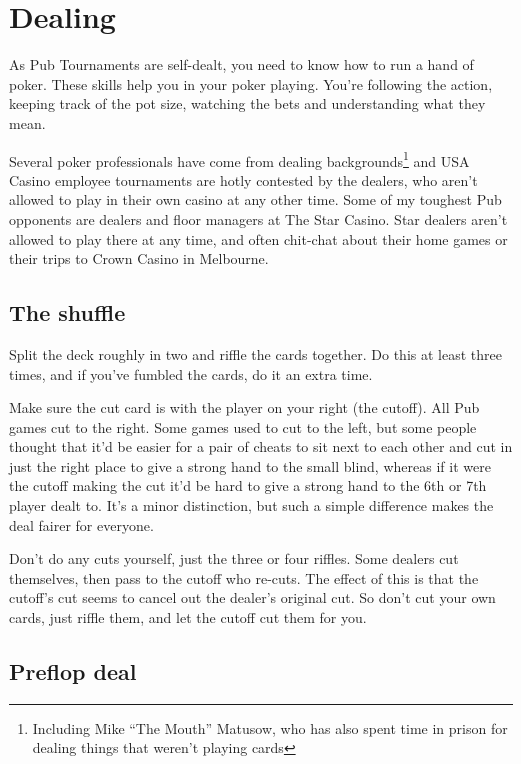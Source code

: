 \chapter{Dealing}


As Pub Tournaments are self-dealt, you need to know how
to run a hand of poker. These skills
help you in your poker playing. You're following
the action, keeping track of the pot size, watching
the bets and understanding what they mean.

Several poker professionals have come from dealing
backgrounds\footnote{Including Mike ``The Mouth'' Matusow, who has also
spent time in prison for dealing things that weren't playing
cards} and USA Casino employee tournaments are hotly contested by
the dealers, who aren't allowed to play in their
own casino at any other time. Some of my toughest Pub opponents
are dealers and floor managers at The Star Casino. Star dealers
aren't allowed to play there at any time, and often chit-chat about
their home games or their trips to Crown Casino in Melbourne.

\section{The shuffle}

Split the deck roughly in two and riffle the cards together.
Do this at least three times, and if you've fumbled the cards,
do it an extra time.

Make sure the cut card is with the player on your right (the cutoff).
All Pub games cut to the right. Some games used to cut to
the left, but some people thought that it'd be
easier for a pair of cheats to sit next to each other and cut in just the
right place to give a strong hand to the small blind, whereas
if it were the cutoff making the cut it'd be hard to give a strong
hand to the 6th or 7th player dealt to. It's a minor distinction,
but such a simple difference makes the deal fairer for everyone.

Don't do any cuts yourself, just the three or four riffles. Some dealers
cut themselves, then pass to the cutoff who re-cuts. The effect of this
is that the cutoff's cut seems to cancel out the dealer's original cut.
So don't cut your own cards, just riffle them, and let the cutoff cut them
for you.

\section{Preflop deal}

